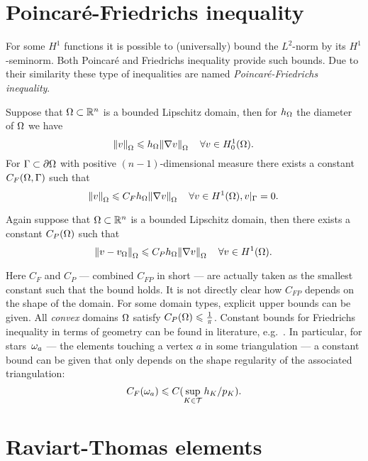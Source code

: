 \documentclass[thesis.tex]{subfiles}
\begin{document}
\section{Poincar\'e-Friedrichs inequality}
\label{sec:poincfried}
For some $H^1$ functions it is possible to (universally) bound the $L^2$-norm by its $H^1$-seminorm.
Both Poincar\'e and Friedrichs inequality provide such bounds. Due to their similarity these type 
of inequalities are named \emph{Poincar\'e-Friedrichs inequality}.
\begin{thm}
  Suppose that $\Omega \subset \mathbb{R}^n$ is a  bounded Lipschitz domain, then for $h_\Omega$ the diameter of $\Omega$ we have
  \[
    \norm{v}_{\Omega} \leqslant h_\Omega  \norm{\nabla v}_{\Omega} \quad \forall v \in H^1_{0}(\Omega).
  \]
  For $\Gamma \subset \partial \Omega$ with positive $(n-1)$-dimensional measure there exists
  a constant $C_F(\Omega, \Gamma)$ such that
  \[
    \norm{v}_{\Omega} \leqslant C_{F} h_\Omega \norm{\nabla v}_{\Omega} \quad \forall v \in H^1(\Omega), v|_{\Gamma} = 0.
  \]
\end{thm}
\begin{thm}
  Again suppose that $\Omega \subset \mathbb{R}^n$ is a bounded Lipschitz domain, then there exists a constant $C_P(\Omega)$ such that
  \[
    \norm{v - v_{\Omega}}_{\Omega} \leqslant C_Ph_\Omega \norm{\nabla v}_{\Omega} \quad \forall v \in H^1(\Omega).
  \]
\end{thm}
Here $C_F$ and $C_P$ --- combined $C_{FP}$ in short --- are actually taken as the smallest constant such that the bound holds.
It is not directly clear how $C_{FP}$ depends on the shape of the domain. For some domain types, explicit
upper bounds can be given. All \emph{convex} domains $\Omega$  satisfy $C_{P}(\Omega) \leqslant \frac{1}{\pi}$.
Constant bounds for Friedrichs inequality in terms of geometry can be found in literature,
e.g.~\cite{zheng2005friedrichs, veeser2011poincare}. In particular, for stars~$\omega_a$  --- the elements touching
a vertex $a$ in some triangulation --- a constant bound can be given that only depends on the shape regularity of 
the associated triangulation: 
\[C_{F}(\omega_a) \leqslant C(\sup_{K \in \mathcal{T}} h_K / p_K).\]

\section{Raviart-Thomas elements}
\end{document}
